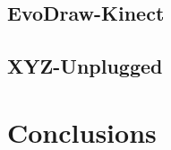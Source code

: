 



\subsection{EvoDraw-Kinect}
\subsection{XYZ-Unplugged}


\section{Conclusions}
\label{sec:conclusions}

\begin{acks}


\end{acks}
